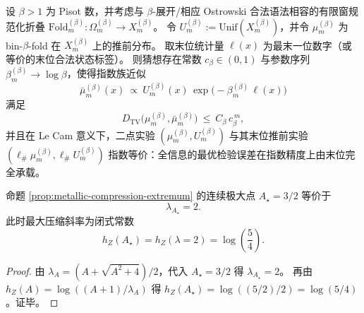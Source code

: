 \begin{conjecture}\label{conj:ostrowski-pisot-last-digit-dominance-lecam}
设 \(\beta>1\) 为 Pisot 数，并考虑与 \(\beta\)-展开/相应 Ostrowski 合法语法相容的有限窗规范化折叠
\(
\mathrm{Fold}^{(\beta)}_m:\Omega_m^{(\beta)}\to X_m^{(\beta)}
\)。
令 \(U_m^{(\beta)}:=\mathrm{Unif}(X_m^{(\beta)})\)，并令 \(\mu_m^{(\beta)}\) 为 bin-\(\beta\)-fold 在 \(X_m^{(\beta)}\) 上的推前分布。
取末位统计量 \(\ell(x)\) 为最末一位数字（或等价的末位合法状态标签）。
则猜想存在常数 \(c_\beta\in(0,1)\) 与参数序列 \(\beta_m^{(\beta)}\to\log\beta\)，使得指数族近似
\[
\bar\mu_m^{(\beta)}(x)\ \propto\ U_m^{(\beta)}(x)\,\exp\!\bigl(-\beta_m^{(\beta)}\,\ell(x)\bigr)
\]
满足
\[
D_{\mathrm{TV}}\bigl(\mu_m^{(\beta)},\bar\mu_m^{(\beta)}\bigr)\ \le\ C_\beta\,c_\beta^{\,m},
\]
并且在 Le Cam 意义下，二点实验 \((\mu_m^{(\beta)},U_m^{(\beta)})\) 与其末位推前实验 \((\ell_\#\mu_m^{(\beta)},\ell_\#U_m^{(\beta)})\) 指数等价：全信息的最优检验误差在指数精度上由末位完全承载。
\end{conjecture}

\begin{corollary}[最大投影压缩的“语法熵锁定”：\texorpdfstring{$\lambda=2$}{lambda=2}]\label{cor:metallic-compression-locking-lambda2}
命题 \ref{prop:metallic-compression-extremum} 的连续极大点 \(A_\star=3/2\) 等价于
\[
\lambda_{A_\star}=2.
\]
此时最大压缩斜率为闭式常数
\[
h_Z(A_\star)=h_Z(\lambda=2)=\log\!\left(\frac{5}{4}\right).
\]
\end{corollary}
\begin{proof}
由 \(\lambda_A=(A+\sqrt{A^2+4})/2\)，代入 \(A_\star=3/2\) 得 \(\lambda_{A_\star}=2\)。
再由 \(h_Z(A)=\log((A+1)/\lambda_A)\) 得
\(
h_Z(A_\star)=\log((5/2)/2)=\log(5/4)
\)。证毕。
\end{proof}

